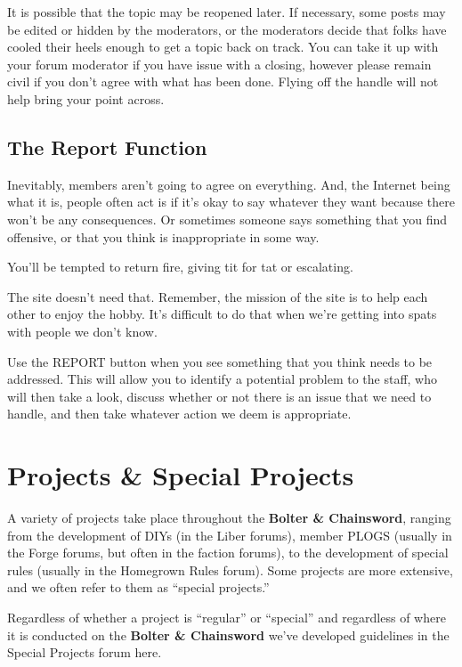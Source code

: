 \documentclass[12pt]{article}
\newcommand{\bnc}{{\textbf{Bolter \& Chainsword}}}%
\begin{document}
It is possible that the topic may be reopened later. If necessary, some 
posts may be edited or hidden by the moderators, or the moderators 
decide that folks have cooled their heels enough to get a topic back on 
track. You can take it up with your forum moderator if you have issue 
with a closing, however please remain civil if you don't agree with 
what has been done. Flying off the handle will not help bring your 
point across.

\subsection{The Report Function}

Inevitably, members aren't going to agree on everything. And, the 
Internet being what it is, people often act is if it's okay to say 
whatever they want because there won't be any consequences. Or 
sometimes someone says something that you find offensive, or that you 
think is inappropriate in some way.

You'll be tempted to return fire, giving tit for tat or escalating.

The site doesn't need that. Remember, the mission of the site is to 
help each other to enjoy the hobby. It's difficult to do that when 
we're getting into spats with people we don't know.

Use the REPORT button when you see something that you think needs to be 
addressed. This will allow you to identify a potential problem to the 
staff, who will then take a look, discuss whether or not there is an 
issue that we need to handle, and then take whatever action we deem is 
appropriate.


\section{Projects \& Special Projects}

A variety of projects take place throughout the {\bnc}, 
ranging from the development of DIYs (in the Liber forums), member 
PLOGS (usually in the Forge forums, but often in the faction forums), 
to the development of special rules (usually in the Homegrown Rules 
forum). Some projects are more extensive, and we often refer to them as 
``special projects.''

Regardless of whether a project is ``regular'' or ``special'' and 
regardless of where it is conducted on the {\bnc} we've developed 
guidelines in the Special Projects forum here.
\end{document}
